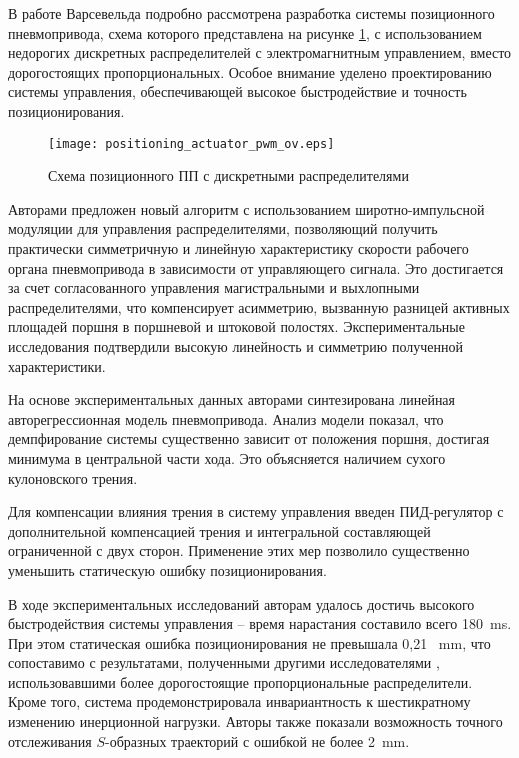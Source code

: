 
В работе Варсевельда \cite*{pwm:Varseveld} подробно рассмотрена разработка системы позиционного пневмопривода, схема которого представлена на
рисунке \ref*{fig:позиционный_пп_pwm}, с использованием недорогих
дискретных распределителей с электромагнитным управлением, вместо дорогостоящих пропорциональных. Особое внимание уделено
проектированию системы управления, обеспечивающей высокое быстродействие и точность позиционирования.

\begin{figure}[htpb]
    \centerfloat
    \texttt{[image: positioning\_actuator\_pwm\_ov.eps]}
    \caption{Схема позиционного ПП с дискретными распределителями}\label{fig:позиционный_пп_pwm}
\end{figure}

Авторами предложен новый алгоритм с использованием широтно-импульсной модуляции для управления распределителями, позволяющий
получить практически симметричную и линейную характеристику скорости рабочего органа пневмопривода в зависимости от управляющего сигнала.
Это достигается за счет согласованного управления магистральными и выхлопными распределителями, что компенсирует асимметрию,
вызванную разницей активных площадей поршня в поршневой и штоковой полостях. Экспериментальные исследования подтвердили высокую линейность и
симметрию полученной характеристики.

На основе экспериментальных данных авторами синтезирована линейная авторегрессионная модель пневмопривода.
Анализ модели показал, что демпфирование системы существенно зависит от положения поршня, достигая минимума в
центральной части хода. Это объясняется наличием сухого кулоновского трения.

Для компенсации влияния трения в систему управления введен ПИД-регулятор с дополнительной компенсацией
трения и интегральной составляющей ограниченной с двух сторон. Применение этих мер позволило существенно уменьшить статическую
ошибку позиционирования.

В ходе экспериментальных исследований авторам удалось достичь высокого быстродействия системы управления --
время нарастания составило всего 180~\si{\milli\second}. При этом статическая ошибка позиционирования не превышала 0,21~
\si{\milli\metre},
что сопоставимо с результатами, полученными другими исследователями
\cite*{Varseveld:article1,Varseveld:article2,Varseveld:article3,Surgenor1997ContinuousSM},
использовавшими более дорогостоящие
пропорциональные распределители. Кроме того, система продемонстрировала инвариантность к шестикратному изменению
инерционной нагрузки. Авторы также показали возможность точного отслеживания $S$-образных траекторий с ошибкой не
более 2~\si{\milli\metre}.

